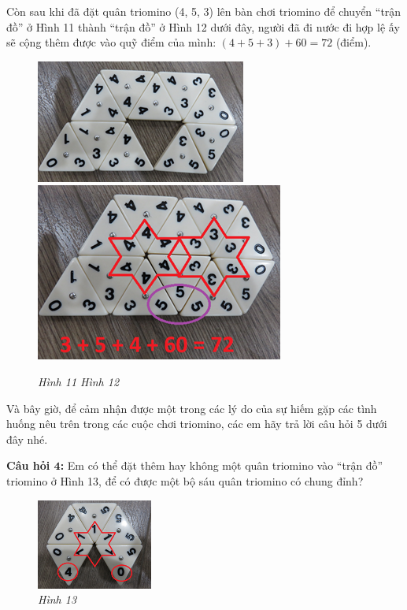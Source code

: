 	Còn sau khi đã đặt quân triomino (4, 5, 3) lên bàn chơi triomino để chuyển “trận đồ” ở Hình 11 thành “trận đồ” ở Hình 12 dưới đây, người đã đi nước đi hợp lệ ấy sẽ cộng thêm được vào quỹ điểm của mình:
	\vskip 0.1cm
	\hspace*{40pt} $(4+5+3)+60=72$ (điểm).
	\vskip 0.1cm
	\begin{figure}[H]
		\centering
		\vspace*{-5pt}
		\captionsetup{labelformat=empty, justification=centering}
		\includegraphics[height=0.25\textwidth]{h11a}\quad
		\includegraphics[height=0.25\textwidth]{h12a}
		\caption{\textit{\small Hình 11 \hspace*{75pt} Hình 12}}
		\vspace*{-5pt}
	\end{figure}
	Và bây giờ, để cảm nhận được một trong các lý do của sự hiếm gặp các tình huống nêu trên trong các cuộc chơi triomino, các em hãy trả lời câu hỏi 5 dưới đây nhé.
	\vskip 0.1cm
	\begin{multicols}{2}
		\textbf{Câu hỏi $\pmb{4}$:}
		\vskip 0.1cm
		Em có thể đặt thêm hay không một quân  triomino vào “trận đồ” triomino ở Hình 13, để có được một bộ sáu quân triomino có chung đỉnh?
		\begin{figure}[H]
			\centering
			\captionsetup{labelformat=empty, justification=centering}
			\includegraphics[width=0.34\textwidth]{h13a}
			\caption{\textit{\small Hình 13}}
			\vspace*{-5pt}
		\end{figure}
	\end{multicols}

